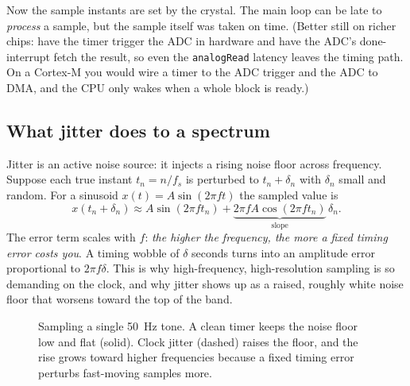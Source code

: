 Now the sample instants are set by the crystal. The main loop can be late to \emph{process} a
sample, but the sample itself was taken on time. (Better still on richer chips: have the timer
trigger the ADC in hardware and have the ADC's done-interrupt fetch the result, so even the
\texttt{analogRead} latency leaves the timing path. On a Cortex-M you would wire a timer to the
ADC trigger and the ADC to DMA, and the CPU only wakes when a whole block is ready.)

\subsection{What jitter does to a spectrum}

Jitter is an active noise source: it injects a rising noise floor across frequency. Suppose each true instant $t_n = n/f_s$ is
perturbed to $t_n + \delta_n$ with $\delta_n$ small and random. For a sinusoid
$x(t)=A\sin(2\pi f t)$ the sampled value is
\[
  x(t_n+\delta_n) \approx A\sin(2\pi f t_n) + \underbrace{2\pi f A\cos(2\pi f t_n)}_{\text{slope}}\,\delta_n .
\]
The error term scales with $f$: \emph{the higher the frequency, the more a fixed timing error
costs you}. A timing wobble of $\delta$ seconds turns into an amplitude error proportional to
$2\pi f \delta$. This is why high-frequency, high-resolution sampling is so demanding on the
clock, and why jitter shows up as a raised, roughly white noise floor that worsens toward the top
of the band.

\begin{figure}[H]
\centering
{}
\caption{Sampling a single 50~Hz tone. A clean timer keeps the noise floor low and flat (solid).
Clock jitter (dashed) raises the floor, and the rise grows toward higher frequencies because a
fixed timing error perturbs fast-moving samples more.}
\label{ch40:fig-jitter}
\end{figure}


